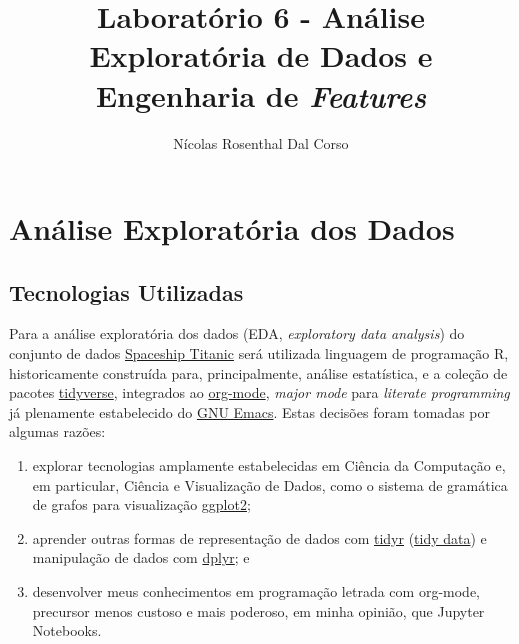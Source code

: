 \documentclass[12pt,a4paper]{article}
\author{Nícolas Rosenthal Dal Corso}
\date{\date}
\title{Laboratório 6 - Análise Exploratória de Dados e Engenharia de \emph{Features}}
\begin{document}
\maketitle
\setcounter{tocdepth}{3}
\tableofcontents

\section{Análise Exploratória dos Dados}
\label{sec:org630f56d}
\subsection{Tecnologias Utilizadas}
\label{sec:org141cb82}
Para a análise exploratória dos dados (EDA, \emph{exploratory data analysis}) do conjunto de dados \href{https://www.kaggle.com/competitions/spaceship-titanic}{Spaceship Titanic} será utilizada linguagem de programação R, historicamente construída para, principalmente, análise estatística, e a coleção de pacotes \href{https://tidyverse.org/}{tidyverse}, integrados ao \href{https://orgmode.org/}{org-mode}, \emph{major mode} para \emph{literate programming} já plenamente estabelecido do \href{https://www.gnu.org/software/emacs/}{GNU Emacs}. Estas decisões foram tomadas por algumas razões:

\begin{enumerate}
\item explorar tecnologias amplamente estabelecidas em Ciência da Computação e, em particular, Ciência e Visualização de Dados, como o sistema de gramática de grafos para visualização \href{https://ggplot2.tidyverse.org/}{ggplot2};
\item aprender outras formas de representação de dados com \href{https://tidyr.tidyverse.org/}{tidyr} (\href{https://data.europa.eu/apps/data-visualisation-guide/intro-to-tidy-data}{tidy data}) e manipulação de dados com \href{https://dplyr.tidyverse.org/}{dplyr}; e
\item desenvolver meus conhecimentos em programação letrada com org-mode, precursor menos custoso e mais poderoso, em minha opinião, que Jupyter Notebooks.
\end{enumerate}
\end{document}
